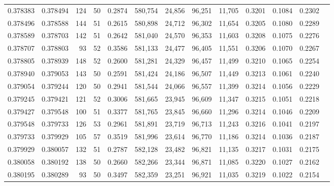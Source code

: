 \begin{tabular}{rrrrrrrrrrrrr}
0.378383 & 0.378494 &   124 &  50 &                                     0.2874 & 580,754 &  24,856 &  96,251 &  11,705 & 0.3201 & 0.1084 & 0.2302 \\
0.378496 & 0.378588 &   144 &  51 &                                     0.2615 & 580,898 &  24,712 &  96,302 &  11,654 & 0.3205 & 0.1080 & 0.2289 \\
0.378589 & 0.378703 &   142 &  51 &                                     0.2642 & 581,040 &  24,570 &  96,353 &  11,603 & 0.3208 & 0.1075 & 0.2276 \\
0.378707 & 0.378803 &    93 &  52 &                                     0.3586 & 581,133 &  24,477 &  96,405 &  11,551 & 0.3206 & 0.1070 & 0.2267 \\
0.378805 & 0.378939 &   148 &  52 &                                     0.2600 & 581,281 &  24,329 &  96,457 &  11,499 & 0.3210 & 0.1065 & 0.2254 \\
0.378940 & 0.379053 &   143 &  50 &                                     0.2591 & 581,424 &  24,186 &  96,507 &  11,449 & 0.3213 & 0.1061 & 0.2240 \\
0.379054 & 0.379244 &   120 &  50 &                                     0.2941 & 581,544 &  24,066 &  96,557 &  11,399 & 0.3214 & 0.1056 & 0.2229 \\
0.379245 & 0.379421 &   121 &  52 &                                     0.3006 & 581,665 &  23,945 &  96,609 &  11,347 & 0.3215 & 0.1051 & 0.2218 \\
0.379427 & 0.379548 &   100 &  51 &                                     0.3377 & 581,765 &  23,845 &  96,660 &  11,296 & 0.3214 & 0.1046 & 0.2209 \\
0.379548 & 0.379733 &   126 &  53 &                                     0.2961 & 581,891 &  23,719 &  96,713 &  11,243 & 0.3216 & 0.1041 & 0.2197 \\
0.379733 & 0.379929 &   105 &  57 &                                     0.3519 & 581,996 &  23,614 &  96,770 &  11,186 & 0.3214 & 0.1036 & 0.2187 \\
0.379929 & 0.380057 &   132 &  51 &                                     0.2787 & 582,128 &  23,482 &  96,821 &  11,135 & 0.3217 & 0.1031 & 0.2175 \\
0.380058 & 0.380192 &   138 &  50 &                                     0.2660 & 582,266 &  23,344 &  96,871 &  11,085 & 0.3220 & 0.1027 & 0.2162 \\
0.380195 & 0.380289 &    93 &  50 &                                     0.3497 & 582,359 &  23,251 &  96,921 &  11,035 & 0.3219 & 0.1022 & 0.2154 \\

\end{tabular}
